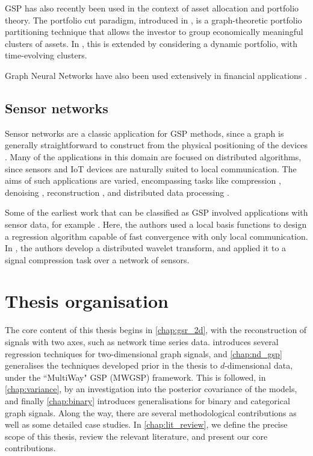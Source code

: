 GSP has also recently been used in the context of asset allocation and portfolio theory. The portfolio cut paradigm, introduced in \citep{Dees2020}, is a graph-theoretic portfolio partitioning technique that allows the investor to group economically meaningful clusters of assets. In \citep{Arroyo2022}, this is extended by considering a dynamic portfolio, with time-evolving clusters. 

Graph Neural Networks have also been used extensively in financial applications \citep{Wang2022c}. 


\subsection{Sensor networks}

Sensor networks are a classic application for GSP methods, since a graph is generally straightforward to construct from the physical positioning of the devices \citep{Jablonski2017}. Many of the applications in this domain are focused on distributed algorithms, since sensors and IoT devices are naturally suited to local communication. The aims of such applications are varied, encompassing tasks like compression \citep{Zhu2012}, denoising \citep{Tay2021}, reconstruction \citep{Wang2015}, and distributed data processing \citep{Chi2022}. 

Some of the earliest work that can be classified as GSP involved applications with sensor data, for example \cite{Guestrin2004}. Here, the authors used a local basis functions to design a regression algorithm capable of fast convergence with only local communication. In \cite{Wagner2005}, the authors develop a distributed wavelet transform, and applied it to a signal compression task over a network of sensors. 

\section{Thesis organisation}

The core content of this thesis begins in \cref{chap:gsr_2d}, with the reconstruction of signals with two axes, such as network time series data.  introduces several regression techniques for two-dimensional graph signals, and \cref{chap:nd_gsp} generalises the techniques developed prior in the thesis to $d$-dimensional data, under the ``MultiWay" GSP (MWGSP) framework. This is followed, in \cref{chap:variance}, by an investigation into the posterior covariance of the models, and finally \cref{chap:binary} introduces generalisations for binary and categorical graph signals. Along the way, there are several methodological contributions as well as some detailed case studies. In \cref{chap:lit_review}, we define the precise scope of this thesis, review the relevant literature, and present our core contributions. 
